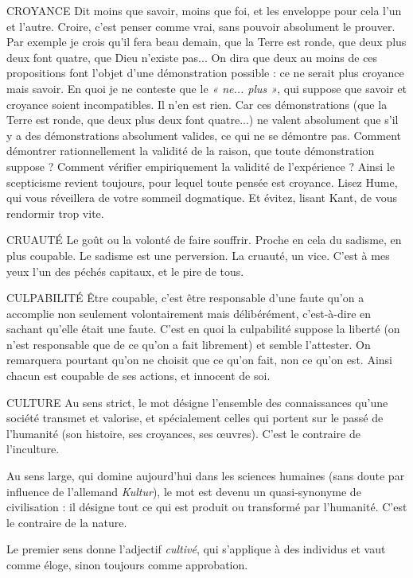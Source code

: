 CROYANCE Dit moins que savoir, moins que foi, et les enveloppe pour
cela l’un et l’autre. Croire, c’est penser comme vrai, sans pouvoir
absolument le prouver. Par exemple je crois qu’il fera beau demain, que la
Terre est ronde, que deux plus deux font quatre, que Dieu n’existe pas... On
dira que deux au moins de ces propositions font l’objet d’une démonstration
possible : ce ne serait plus croyance mais savoir. En quoi je ne conteste que le
{\it « ne... plus »}, qui suppose que savoir et croyance soient incompatibles. Il n’en
est rien. Car ces démonstrations (que la Terre est ronde, que deux plus deux
font quatre...) ne valent absolument que s’il y a des démonstrations absolument
valides, ce qui ne se démontre pas. Comment démontrer rationnellement
la validité de la raison, que toute démonstration suppose ? Comment vérifier
empiriquement la validité de l’expérience ? Ainsi le scepticisme revient toujours,
pour lequel toute pensée est croyance. Lisez Hume, qui vous réveillera de
votre sommeil dogmatique. Et évitez, lisant Kant, de vous rendormir trop
vite.

CRUAUTÉ Le goût ou la volonté de faire souffrir. Proche en cela du
sadisme, en plus coupable. Le sadisme est une perversion. La
cruauté, un vice. C’est à mes yeux l’un des péchés capitaux, et le pire de tous.

CULPABILITÉ Être coupable, c’est être responsable d’une faute qu’on a
accomplie non seulement volontairement mais délibérément,
c’est-à-dire en sachant qu’elle était une faute. C’est en quoi la culpabilité
suppose la liberté (on n’est responsable que de ce qu’on a fait librement) et
semble l’attester. On remarquera pourtant qu’on ne choisit que ce qu’on fait,
non ce qu’on est. Ainsi chacun est coupable de ses actions, et innocent de soi.

CULTURE Au sens strict, le mot désigne l’ensemble des connaissances
qu’une société transmet et valorise, et spécialement celles qui
portent sur le passé de l'humanité (son histoire, ses croyances, ses œuvres).
C’est le contraire de l’inculture.

Au sens large, qui domine aujourd’hui dans les sciences humaines (sans
doute par influence de l'allemand {\it Kultur}), le mot est devenu un quasi-synonyme
de civilisation : il désigne tout ce qui est produit ou transformé par
l’humanité. C’est le contraire de la nature.

Le premier sens donne l'adjectif {\it cultivé}, qui s'applique à des individus et
vaut comme éloge, sinon toujours comme approbation.

